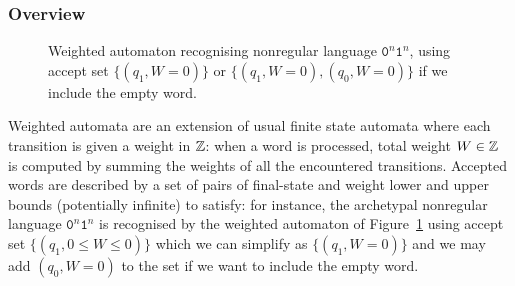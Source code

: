\subsubsection{Overview}\label{sec:WFAR:overview}



\begin{figure}
    \centering
    \caption{Weighted automaton recognising nonregular language $\texttt{0}^n \texttt{1}^n$, using accept set $\{(q_1,W=0)\}$ or $\{(q_1,W=0), (q_0,W=0)\}$ if we include the empty word.}\label{fig:ex_wa}
\end{figure}

Weighted automata are an extension of usual finite state automata where each transition is given a weight in $\mathbb{Z}$: when a word is processed, total weight $W \in \mathbb{Z}$ is computed by summing the weights of all the encountered transitions. Accepted words are described by a set of pairs of final-state and weight lower and upper bounds (potentially infinite) to satisfy: for instance, the archetypal nonregular language $\texttt{0}^n \texttt{1}^n$ is recognised by the weighted automaton of Figure~\ref{fig:ex_wa} using accept set $\{(q_1,0 \leq W \leq 0)\}$ which we can simplify as $\{(q_1,W=0)\}$ and we may add $(q_0,W=0)$ to the set if we want to include the empty word.

